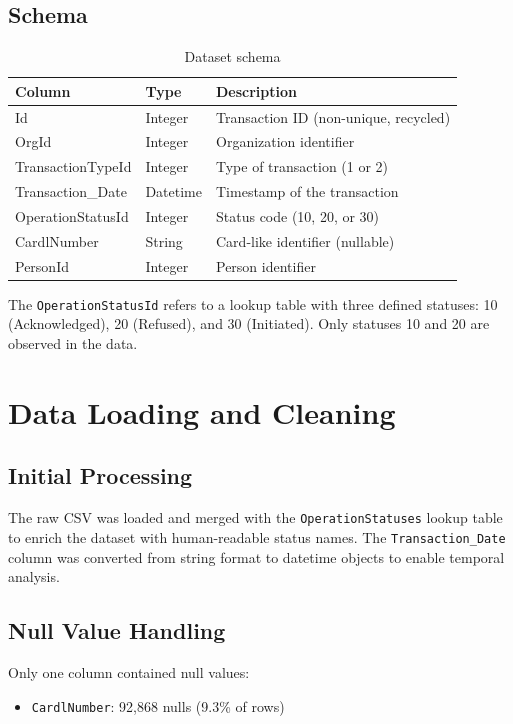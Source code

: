 \documentclass[11pt,a4paper]{article}
\begin{document}
\subsection{Schema}

\begin{table}[H]
\centering
\begin{tabular}{lll}
\toprule
\textbf{Column} & \textbf{Type} & \textbf{Description} \\
\midrule
Id & Integer & Transaction ID (non-unique, recycled) \\
OrgId & Integer & Organization identifier \\
TransactionTypeId & Integer & Type of transaction (1 or 2) \\
Transaction\_Date & Datetime & Timestamp of the transaction \\
OperationStatusId & Integer & Status code (10, 20, or 30) \\
CardlNumber & String & Card-like identifier (nullable) \\
PersonId & Integer & Person identifier \\
\bottomrule
\end{tabular}
\caption{Dataset schema}
\end{table}

The \texttt{OperationStatusId} refers to a lookup table with three defined statuses: 10 (Acknowledged), 20 (Refused), and 30 (Initiated). Only statuses 10 and 20 are observed in the data.

\section{Data Loading and Cleaning}

\subsection{Initial Processing}

The raw CSV was loaded and merged with the \texttt{OperationStatuses} lookup table to enrich the dataset with human-readable status names. The \texttt{Transaction\_Date} column was converted from string format to datetime objects to enable temporal analysis.

\subsection{Null Value Handling}

Only one column contained null values:
\begin{itemize}
    \item \texttt{CardlNumber}: 92{,}868 nulls (9.3\% of rows)
\end{itemize}
\end{document}
